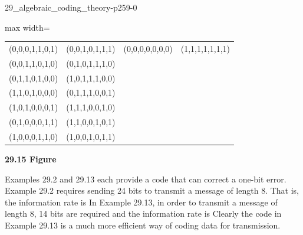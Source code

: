 \documentclass[11pt,oneside]{article}
\begin{document}
\begin{BookBody}

\begin{BookFloat}{29_algebraic_coding_theory-p259-0}
\begin{center}\begin{adjustbox}{max width=\linewidth}
\renewcommand{\arraystretch}{1.2}\setlength{\tabcolsep}{5pt}
\begin{tabular}{cccc}
(0,0,0,1,1,0,1) & (0,0,1,0,1,1,1) & (0,0,0,0,0,0,0) & (1,1,1,1,1,1,1)\\
(0,0,1,1,0,1,0) & (0,1,0,1,1,1,0) &  & \\
(0,1,1,0,1,0,0) & (1,0,1,1,1,0,0) &  & \\
(1,1,0,1,0,0,0) & (0,1,1,1,0,0,1) &  & \\
(1,0,1,0,0,0,1) & (1,1,1,0,0,1,0) &  & \\
(0,1,0,0,0,1,1) & (1,1,0,0,1,0,1) &  & \\
(1,0,0,0,1,1,0) & (1,0,0,1,0,1,1) &  & \\
\end{tabular}
\end{adjustbox}\end{center}
\begin{center}\small\textbf{29.15 Figure}\end{center}
\end{BookFloat}

Examples 29.2 and 29.13 each provide a code that can correct a one-bit error. Example 29.2 requires sending 24 bits to transmit a message of length 8. That is, the information rate is  In Example 29.13, in order to transmit a message of length 8, 14 bits are required and the information rate is  Clearly the code in Example 29.13 is a much more efficient way of coding data for transmission.

\end{BookBody}

\BookNarrativefalse
\end{document}
